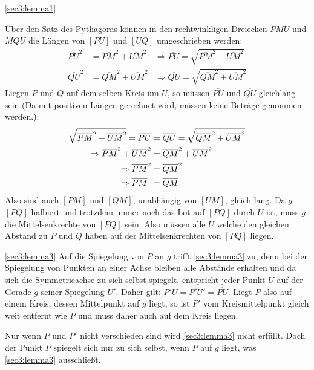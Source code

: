 \documentclass[10pt, a4paper, reqno]{amsart}
\makeatletter
\renewcommand\proofname{Beweis}
\renewenvironment{proof}[1][\proofname]{\par
\pushQED{\qed}%
\normalfont \topsep6\p@\@plus6\p@\relax
\trivlist
\item\relax
{\bfseries#1}\hspace\labelsep\ignorespaces
}{%
\popQED\endtrivlist\@endpefalse
}
\newenvironment{proof_thm}[1]{
\begin{proof}[\proofname~(#1)]}{\end{proof}}
\makeatother
\begin{document}
\begin{proof_thm}{\autoref{sec3:lemma1}}
\begin{figure}[h]
    \caption{}
    \label{fig:3}
  \end{figure}
  Über den Satz des Pythagoras können in den rechtwinkligen Dreiecken $PMU$ und $MQU$ die Längen von $[PU]$ und $[UQ]$
  umgeschrieben werden:
  \begin{align*}
    \overline{PU}^2&=\overline{PM}^2+\overline{UM}^2 &\Rightarrow \overline{PU}=\sqrt{\overline{PM}^2+\overline{UM}^2}\\
    \overline{QU}^2&=\overline{QM}^2+\overline{UM}^2 &\Rightarrow \overline{QU}=\sqrt{\overline{QM}^2+\overline{UM}^2}
  \end{align*}
  Liegen $P$ und $Q$ auf dem selben Kreis um $U$, so müssen $\overline{PU}$ und
  $\overline{QU}$ gleichlang sein (Da mit positiven Längen gerechnet wird,
  müssen keine Beträge genommen werden.):
  \begin{align*}
    \sqrt{\overline{PM}^2+\overline{UM}^2} = \overline{PU} &= \overline{QU} = \sqrt{\overline{QM}^2+\overline{UM}^2}\\
    \Rightarrow\overline{PM}^2+\overline{UM}^2 &= \overline{QM}^2+\overline{UM}^2\\
    \Rightarrow\overline{PM}^2&=\overline{QM}^2\\
    \Rightarrow\overline{PM}\hphantom{{}^2}&=\overline{QM}
  \end{align*}
  Also sind auch $[PM]$ und $[QM]$, unabhängig von $[UM]$, gleich
  lang. Da $g$ $[PQ]$ halbiert und trotzdem immer noch das Lot auf $[PQ]$ durch $U$ ist, muss $g$
  die Mittelsenkrechte von $[PQ]$ sein. Also müssen alle $U$ welche den
  gleichen Abstand zu $P$ und $Q$ haben auf der Mittelsenkrechten von $[PQ]$
  liegen.
\end{proof_thm}
\begin{proof_thm}{\autoref{sec3:lemma3}}
  Auf die Spiegelung von $P$ an $g$ trifft \autoref{sec3:lemma3} zu, denn bei
  der Spiegelung von Punkten an einer Achse bleiben alle Abstände erhalten und
  da sich die Symmetrieachse zu sich selbst spiegelt, entspricht jeder Punkt $U$
  auf der Gerade $g$ seiner Spiegelung $U'$. Daher gilt:
  $\overline{P'U}=\overline{P'U'}=\overline{PU}$. Liegt $P$ also auf einem
  Kreis, dessen Mittelpunkt auf $g$ liegt, so ist $P'$ vom
  Kreismittelpunkt gleich weit entfernt wie $P$ und muss daher auch auf dem Kreis liegen.

  Nur wenn $P$ und $P'$ nicht verschieden sind wird \autoref{sec3:lemma3} nicht
  erfüllt. Doch der Punkt $P$ spiegelt sich nur zu sich selbst, wenn $P$ auf $g$ liegt, was
  \autoref{sec3:lemma3} ausschließt.
\end{proof_thm}
\end{document}
